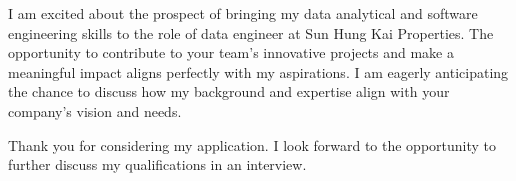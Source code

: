 \documentclass[11pt, a4paper]{awesome-cv}
\begin{document}
\begin{cvletter}
I am excited about the prospect of bringing my data analytical and software engineering skills to the role of data engineer at Sun Hung Kai Properties. The opportunity to contribute to your team's innovative projects and make a meaningful impact aligns perfectly with my aspirations. I am eagerly anticipating the chance to discuss how my background and expertise align with your company's vision and needs.

Thank you for considering my application. I look forward to the opportunity to further discuss my qualifications in an interview.

\end{cvletter}


\makeletterclosing
\end{document}
